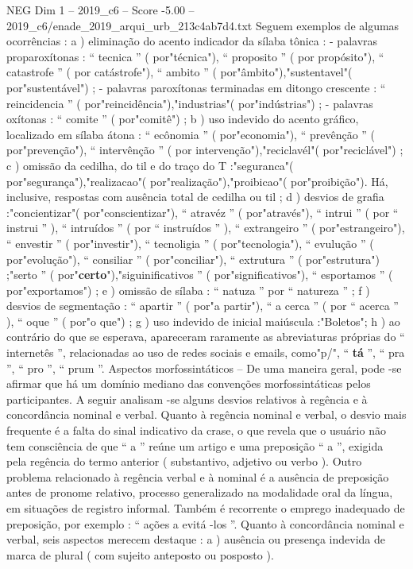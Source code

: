 \begin{textsample}{NEG Dim 1 – 2019\_c6 – Score -5.00 – 2019\_c6/enade\_2019\_arqui\_urb\_213c4ab7d4.txt}
Seguem exemplos de algumas ocorrências : a ) eliminação do acento indicador da sílaba tônica : - palavras proparoxítonas : “ tecnica ” ( por"técnica"), “ proposito ” ( por propósito"), “ catastrofe ” ( por catástrofe"), “ ambito ” ( por"âmbito"),"sustentavel"( por"sustentável") ; - palavras paroxítonas terminadas em ditongo crescente : “ reincidencia ” ( por"reincidência"),"industrias"( por"indústrias") ; - palavras oxítonas : “ comite ” ( por"comitê") ; b ) uso indevido do acento gráfico, localizado em sílaba átona : “ ecônomia ” ( por"economia"), “ prevênção ” ( por"prevenção"), “ intervênção ” ( por intervenção"),"reciclavél"( por"reciclável") ; c ) omissão da cedilha, do til e do traço do T :"seguranca"( por"segurança"),"realizacao"( por"realização"),"proibicao"( por"proibição").
Há, inclusive, respostas com ausência total de cedilha ou til ; d ) desvios de grafia :"concientizar"( por"conscientizar"), “ atravéz ” ( por"através"), “ intrui ” ( por “ instrui ” ), “ intruídos ” ( por “ instruídos ” ), “ extrangeiro ” ( por"estrangeiro"), “ envestir ” ( por"investir"), “ tecnoligia ” ( por"tecnologia"), “ evulução ” ( por"evolução"), “ consiliar ” ( por"conciliar"), “ extrutura ” ( por"estrutura") ;"serto ” ( por"\textbf{certo}"),"siguinificativos ” ( por"significativos"), “ esportamos ” ( por"exportamos") ; e ) omissão de sílaba : “ natuza ” por “ natureza ” ; f ) desvios de segmentação : “ apartir ” ( por"a partir"), “ a cerca ” ( por “ acerca ” ), “ oque ” ( por"o que") ; g ) uso indevido de inicial maiúscula :"Boletos"; h ) ao contrário do que se esperava, apareceram raramente as abreviaturas próprias do “ internetês ”, relacionadas ao uso de redes sociais e emails, como"p/", “ \textbf{tá} ”, “ pra ”, “ pro ”, “ prum ”.
Aspectos morfossintáticos – De uma maneira geral, pode -se afirmar que há um domínio mediano das convenções morfossintáticas pelos participantes.
A seguir analisam -se alguns desvios relativos à regência e à concordância nominal e verbal.
Quanto à regência nominal e verbal, o desvio mais frequente é a falta do sinal indicativo da crase, o que revela que o usuário não tem consciência de que “ a ” reúne um artigo e uma preposição “ a ”, exigida pela regência do termo anterior ( substantivo, adjetivo ou verbo ).
Outro problema relacionado à regência verbal e à nominal é a ausência de preposição antes de pronome relativo, processo generalizado na modalidade oral da língua, em situações de registro informal.
Também é recorrente o emprego inadequado de preposição, por exemplo : “ ações a evitá -los ”.
Quanto à concordância nominal e verbal, seis aspectos merecem destaque : a ) ausência ou presença indevida de marca de plural ( com sujeito anteposto ou posposto ).

\end{textsample}
